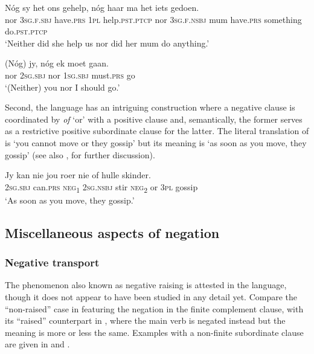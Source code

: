 \documentclass[output=paper,colorlinks,citecolor=brown]{langscibook}
\begin{document}
\ea\label{ex:afr:46}
    \ea\label{ex:afr:46a}
        \gll Nóg sy het ons gehelp, nóg haar ma het iets gedoen. \\  
             nor  \textsc{3sg.f.sbj} have.\textsc{prs} \textsc{1pl} help.\textsc{pst.ptcp} nor \textsc{3sg.f.nsbj}  mum  have.\textsc{prs} something do.\textsc{pst.ptcp}\\
        \glt ‘Neither did she help us nor did her mum do anything.’
    
    \ex\label{ex:afr:46b}
        \gll (Nóg) jy, nóg ek moet gaan. \\
             nor \textsc{2sg.sbj} nor \textsc{1sg.sbj} must.\textsc{prs} go\\
        \glt ‘(Neither) you nor I should go.’
    \z
\z  


Second, the language has an intriguing construction where a negative clause is coordinated by \textit{of} ‘or’ with a positive clause and, semantically, the former serves as a restrictive positive subordinate clause for the latter. The literal translation of  is ‘you cannot move or they gossip’ but its meaning is ‘as soon as you move, they gossip’ (see also \citealt[29]{Ponelis1968}, for further discussion).

\ea\label{ex:afr:47}
    \gll Jy kan nie jou roer nie of hulle skinder. \\ 
         \textsc{2sg.sbj} can.\textsc{prs} \textsc{neg}\textsubscript{1} \textsc{2sg.nsbj} stir \textsc{neg}\textsubscript{2} or 3\textsc{pl} gossip \\
    \glt ‘As soon as you move, they gossip.’ \citep[29]{Ponelis1968}
\z 

\subsection{Miscellaneous aspects of negation}
\subsubsection{Negative transport}

The phenomenon also known as negative raising is attested in the language, though it does not appear to have been studied in any detail yet. Compare the “non-raised” case in  featuring the negation in the finite complement clause, with its “raised” counterpart in , where the main verb is negated instead but the meaning is more or less the same. Examples with a non-finite subordinate clause are given in  and .
\end{document}
